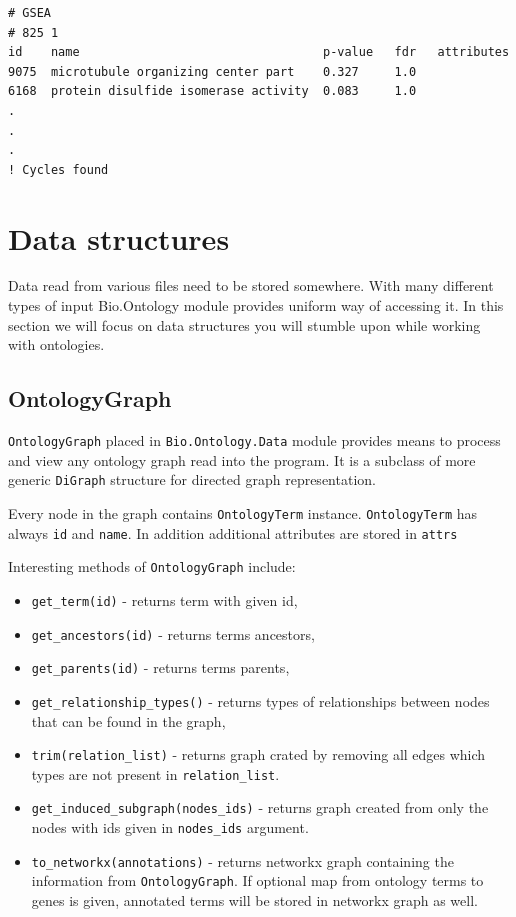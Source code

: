 \documentclass{report}
\begin{document}
\begin{verbatim}
# GSEA
# 825 1
id    name                                  p-value   fdr   attributes
9075  microtubule organizing center part    0.327     1.0
6168  protein disulfide isomerase activity  0.083     1.0
.
.
.
! Cycles found 
\end{verbatim}

\section{Data structures}
Data read from various files need to be stored somewhere. With many different
types of input Bio.Ontology module provides uniform way of accessing it. In this
section we will focus on data structures you will stumble upon while working
with ontologies.

\subsection{OntologyGraph}
\verb|OntologyGraph| placed in \verb|Bio.Ontology.Data| module provides means
to process and view any ontology graph read into the program. It is a subclass
of more generic \verb|DiGraph| structure for directed graph representation.

Every node in the graph contains \verb|OntologyTerm| instance. \verb|OntologyTerm|
has always \verb|id| and \verb|name|. In addition additional attributes are
stored in \verb|attrs|

Interesting methods of \verb|OntologyGraph| include:
\begin{itemize}
\item \verb|get_term(id)| - returns term with given id,
\item \verb|get_ancestors(id)| - returns terms ancestors,
\item \verb|get_parents(id)| - returns terms parents,
\item \verb|get_relationship_types()| - returns types of relationships between
nodes that can be found in the graph,
\item \verb|trim(relation_list)| - returns graph crated by removing all edges
which types are not present in \verb|relation_list|.
\item \verb|get_induced_subgraph(nodes_ids)| - returns graph created from only
the nodes with ids given in \verb|nodes_ids| argument.
\item \verb|to_networkx(annotations)| - returns networkx graph
containing the information from \verb|OntologyGraph|. If optional map
from ontology terms to genes is given, annotated terms will be
stored in networkx graph as well.
\end{itemize}
\end{document}
